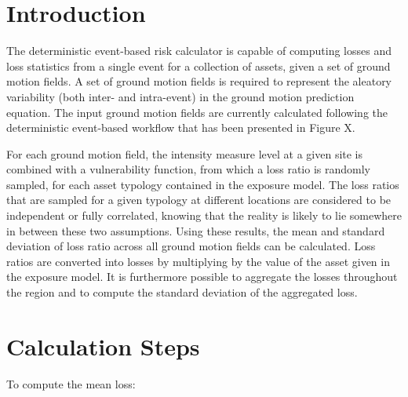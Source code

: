 

\section{Introduction}
The deterministic event-based risk calculator is capable of computing losses and loss statistics from a single event for a collection of assets, given a set of ground motion fields. A set of ground motion fields is required to represent the aleatory variability (both inter- and intra-event) in the ground motion prediction equation. The input ground motion fields are currently calculated following the deterministic event-based workflow that has been presented in Figure X. 

For each ground motion field, the intensity measure level at a given site is combined with a vulnerability function, from which a loss ratio is randomly sampled, for each asset typology contained in the exposure model. The loss ratios that are sampled for a given typology at different locations are considered to be independent or fully correlated, knowing that the reality is likely to lie somewhere in between these two assumptions. Using these results, the mean and standard deviation of loss ratio across all ground motion fields can be calculated. Loss ratios are converted into losses by multiplying by the value of the asset given in the exposure model. It is furthermore possible to aggregate the losses throughout the region and to compute the standard deviation of the aggregated loss. 

\section{Calculation Steps}

To compute the mean loss:

